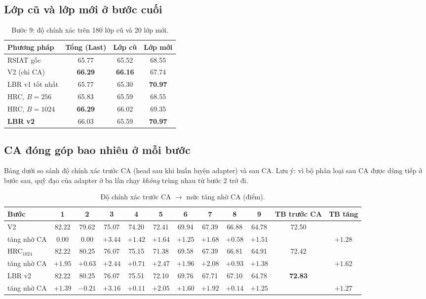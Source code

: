 \documentclass[11pt]{article}
\begin{document}
\subsection{Lớp cũ và lớp mới ở bước cuối}
\begin{table}[H]
\centering\small
\caption{Bước 9: độ chính xác trên 180 lớp cũ và 20 lớp mới.}
\begin{tabular}{lccc}
\toprule
Phương pháp & Tổng (Last) & Lớp cũ & Lớp mới\\
\midrule
RSIAT gốc & 65.77 & 65.52 & 68.55\\
V2 (chỉ CA) & \textbf{66.29} & \textbf{66.16} & 67.74\\
LBR v1 tốt nhất & 65.77 & 65.30 & \textbf{70.97}\\
HRC, $B=256$ & 65.83 & 65.59 & 68.55\\
HRC, $B=1024$ & \textbf{66.29} & 66.02 & 69.35\\
\textbf{LBR v2} & 66.03 & 65.59 & \textbf{70.97}\\
\bottomrule
\end{tabular}
\end{table}

\subsection{CA đóng góp bao nhiêu ở mỗi bước}
Bảng dưới so sánh độ chính xác trước CA (head sau khi huấn luyện adapter) và sau CA. Lưu ý: vì bộ phân loại sau CA
được dùng tiếp ở bước sau, quỹ đạo của adapter ở ba lần chạy \emph{không} trùng nhau từ bước 2 trở đi.

\begin{table}[H]
\centering\small
\caption{Độ chính xác trước CA $\to$ mức tăng nhờ CA (điểm).}
\setlength{\tabcolsep}{3.4pt}
\begin{tabular}{l*{9}{c}cc}
\toprule
Bước & 1 & 2 & 3 & 4 & 5 & 6 & 7 & 8 & 9 & TB trước CA & TB tăng\\
\midrule
V2 & 82.22 & 79.62 & 75.07 & 74.20 & 72.41 & 69.94 & 67.39 & 66.88 & 64.78 & 72.50 & \\
\quad tăng nhờ CA & 0.00 & 0.00 & $+3.44$ & $+1.42$ & $+1.64$ & $+1.25$ & $+1.68$ & $+0.58$ & $+1.51$ & & $+1.28$\\
HRC$_{1024}$ & 82.22 & 80.25 & 76.07 & 75.15 & 71.38 & 69.58 & 67.39 & 66.81 & 64.91 & 72.42 & \\
\quad tăng nhờ CA & $+1.95$ & $+0.63$ & $+2.44$ & $+0.71$ & $+2.47$ & $+1.96$ & $+2.08$ & $+0.93$ & $+1.38$ & & $\mathbf{+1.62}$\\
LBR v2 & 82.22 & 80.25 & 76.07 & 75.51 & 72.10 & 69.76 & 67.71 & 67.10 & 64.78 & \textbf{72.83} & \\
\quad tăng nhờ CA & $+1.39$ & $-0.21$ & $+3.16$ & $+0.11$ & $+2.05$ & $+1.60$ & $+1.92$ & $+0.14$ & $+1.25$ & & $+1.27$\\
\bottomrule
\end{tabular}
\end{table}
\end{document}
